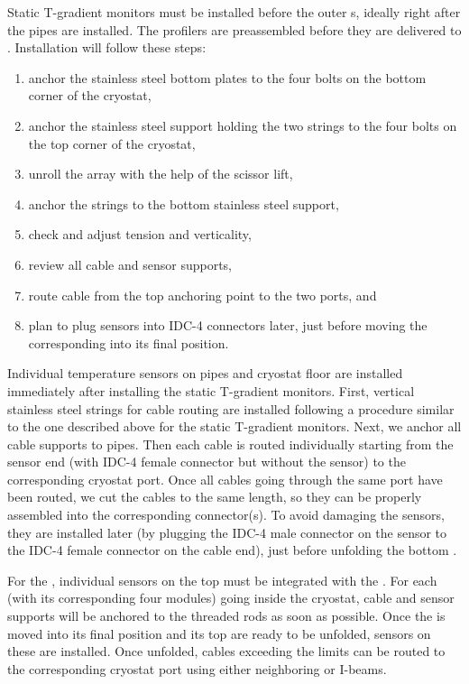 Static T-gradient monitors %
must be installed before the outer s, ideally  
right after the pipes are installed. The profilers %
are preassembled before they are delivered to . 
Installation will follow these steps:
\begin{enumerate}
\item anchor the stainless steel bottom plates to the four bolts on the bottom corner of the cryostat,
\item anchor the stainless steel support holding the two strings to the four bolts on the top corner of the cryostat,
\item unroll the array with the help of the scissor lift,
\item anchor the strings to the bottom stainless steel support,   
\item check and adjust tension and verticality,
\item review all cable and sensor supports, 
\item route cable from the top anchoring point to the two  ports, and 
\item plan to plug sensors into IDC-4 connectors later, just before moving the corresponding  into its final position. 
\end{enumerate}

Individual temperature sensors on pipes and cryostat floor %
are installed immediately after installing the static T-gradient monitors. First, vertical stainless steel strings for cable routing %
are installed following a procedure similar to the one described above for the static T-gradient monitors. Next, we anchor all cable supports to pipes. Then each cable %
is routed individually starting from the sensor end (with IDC-4 female connector but without the sensor)
to the corresponding cryostat port. Once all cables going through the same port have been routed, we cut the cables to the same length, so they can be properly assembled into the corresponding connector(s). To avoid damaging the sensors, they are installed later (by plugging the IDC-4 male connector on the sensor  to the IDC-4 female connector on the cable end), just before unfolding the bottom .

For the , individual sensors on the top  must be integrated with the . For each  (with its corresponding four   modules)
going inside the cryostat, cable and sensor supports will be anchored to the   threaded rods as soon as possible.
Once the  is moved into its final position and its top  are ready to be unfolded, sensors on these  %
are installed. Once unfolded, cables 
exceeding the  limits can be routed to the corresponding cryostat port using either neighboring  or  I-beams. 




